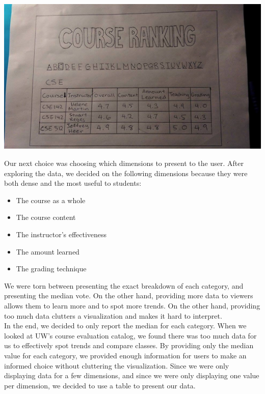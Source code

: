 \documentclass{article}
\begin{document}
\begin{center}
    \includegraphics[width=\textwidth]{3.png}
\end{center}

Our next choice was choosing which dimensions to present to the user. After exploring the data, we decided on the following dimensions because they were both dense and the most useful to students:

\begin{itemize}
    \item The course as a whole
    \item The course content
    \item The instructor's effectiveness
    \item The amount learned
    \item The grading technique
\end{itemize}

We were torn between presenting the exact breakdown of each category, and presenting the median vote. On the other hand, providing more data to viewers allows them to learn more and to spot more trends. On the other hand, providing too much data clutters a visualization and makes it hard to interpret.\\

In the end, we decided to only report the median for each category. When we looked at UW's course evaluation catalog, we found there was too much data for us to effectively spot trends and compare classes. By providing only the median value for each category, we provided enough information for users to make an informed choice without cluttering the visualization. Since we were only displaying data for a few dimensions, and since we were only displaying one value per dimension, we decided to use a table to present our data.\\
\end{document}
